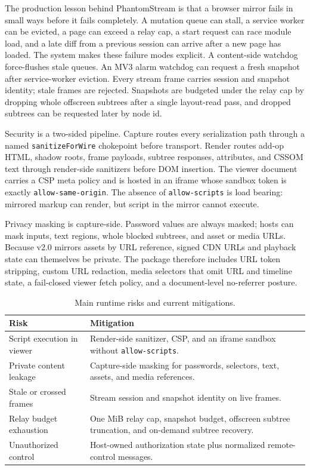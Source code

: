 \documentclass[conference]{IEEEtran}
\newcommand{\code}[1]{\texttt{\small #1}}
\begin{document}
The production lesson behind PhantomStream is that a browser mirror fails in
small ways before it fails completely. A mutation queue can stall, a service
worker can be evicted, a page can exceed a relay cap, a start request can race
module load, and a late diff from a previous session can arrive after a new page
has loaded. The system makes these failure modes explicit. A content-side
watchdog force-flushes stale queues. An MV3 alarm watchdog can request a fresh
snapshot after service-worker eviction. Every stream frame carries session and
snapshot identity; stale frames are rejected. Snapshots are budgeted under the
relay cap by dropping whole offscreen subtrees after a single layout-read pass,
and dropped subtrees can be requested later by node id.

Security is a two-sided pipeline. Capture routes every serialization path through
a named \code{sanitizeForWire} chokepoint before transport. Render routes add-op
HTML, shadow roots, frame payloads, subtree responses, attributes, and CSSOM text
through render-side sanitizers before DOM insertion. The viewer document carries
a CSP meta policy and is hosted in an iframe whose sandbox token is exactly
\code{allow-same-origin}. The absence of \code{allow-scripts} is load bearing:
mirrored markup can render, but script in the mirror cannot execute.

Privacy masking is capture-side. Password values are always masked; hosts can
mask inputs, text regions, whole blocked subtrees, and asset or media URLs.
Because v2.0 mirrors assets by URL reference, signed CDN URLs and playback state
can themselves be private. The package therefore includes URL token stripping,
custom URL redaction, media selectors that omit URL and timeline state, a
fail-closed viewer fetch policy, and a document-level no-referrer posture.

\begin{table}[t]
\centering
\caption{Main runtime risks and current mitigations.}
\label{tab:threats}
\footnotesize
\begin{tabular}{@{}p{} p{}@{}}
\toprule
Risk & Mitigation \\
\midrule
Script execution in viewer & Render-side sanitizer, CSP, and an iframe sandbox
without \code{allow-scripts}. \\
Private content leakage & Capture-side masking for passwords, selectors, text,
assets, and media references. \\
Stale or crossed frames & Stream session and snapshot identity on live frames. \\
Relay budget exhaustion & One MiB relay cap, snapshot budget, offscreen subtree
truncation, and on-demand subtree recovery. \\
Unauthorized control & Host-owned authorization state plus normalized
remote-control messages. \\
\bottomrule
\end{tabular}
\end{table}
\end{document}
